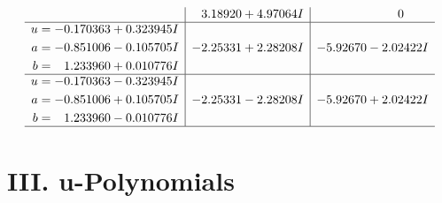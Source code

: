 \documentclass[1p]{elsarticle_modified}
\theoremstyle{definition}
\begin{document}
$$\begin{array}{c|c|c}
 & \phantom{-}3.18920 + 4.97064 I & \phantom{-0.000000 } 0 \\ \hline\begin{aligned}
u &= -0.170363 + 0.323945 I \\
a &= -0.851006 - 0.105705 I \\
b &= \phantom{-}1.233960 + 0.010776 I\end{aligned}
 & -2.25331 + 2.28208 I & -5.92670 - 2.02422 I \\ \hline\begin{aligned}
u &= -0.170363 - 0.323945 I \\
a &= -0.851006 + 0.105705 I \\
b &= \phantom{-}1.233960 - 0.010776 I\end{aligned}
 & -2.25331 - 2.28208 I & -5.92670 + 2.02422 I\\
 \hline 
 \end{array}$$\newpage
\newpage\renewcommand{\arraystretch}{1}
\centering \section*{ III. u-Polynomials}
\end{document}
